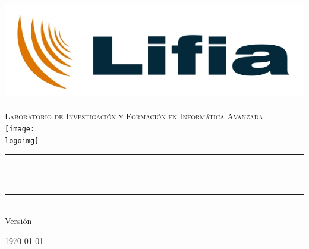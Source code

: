 \ifdefined \HRule \else
	\newcommand{\HRule}{\rule{\linewidth}{0.5mm}}
\fi

\makeatletter
\begin{titlepage}
\begin{center}

\includegraphics{./resources/logo}~\\[1cm]

\textsc{\LARGE Laboratorio de Investigación y Formación en Informática Avanzada }\\[1.5cm]

\ifdefined \logoimg
  \texttt{[image: \\logoimg]}~\\[1cm]
\fi

\HRule \\[0.4cm]
{ \huge \bfseries \@title \\[0.4cm] }

\HRule \\[1.5cm]
{\large Versi\'on \@version \\[0.4cm] }

\vfill

{\large \today}

\end{center}
\end{titlepage}

\makeatother